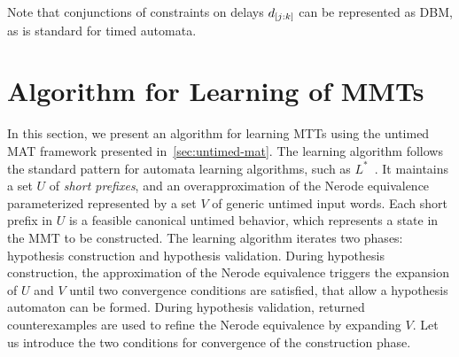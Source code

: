   Note that conjunctions of constraints on delays $d_{[j:k]}$ can be represented as DBM, as is standard for timed automata.

\section{Algorithm for Learning of MMTs}
\label{sec:learning}

In this section, we present an algorithm for learning MTTs using the untimed
MAT framework presented in~\ref{sec:untimed-mat}.
The learning algorithm follows the standard pattern for automata learning
algorithms, such as $L^*$~\cite{Ang87}. It maintains
a set $U$ of {\em short prefixes}, and
  an overapproximation of the Nerode equivalence
  parameterized represented by a set $V$ of generic untimed input words.
Each short prefix in $U$ is a feasible canonical untimed
behavior, which represents a state in the MMT to be constructed.
The learning algorithm iterates two phases: hypothesis construction and
hypothesis validation.
During hypothesis construction,
the approximation of the Nerode equivalence triggers the expansion of
$U$ and $V$ until two convergence conditions are satisfied, that allow
a hypothesis automaton can be formed.
During hypothesis validation, returned counterexamples are used to refine
the Nerode equivalence by expanding $V$.
Let us introduce the two conditions for convergence of the construction phase.

  
